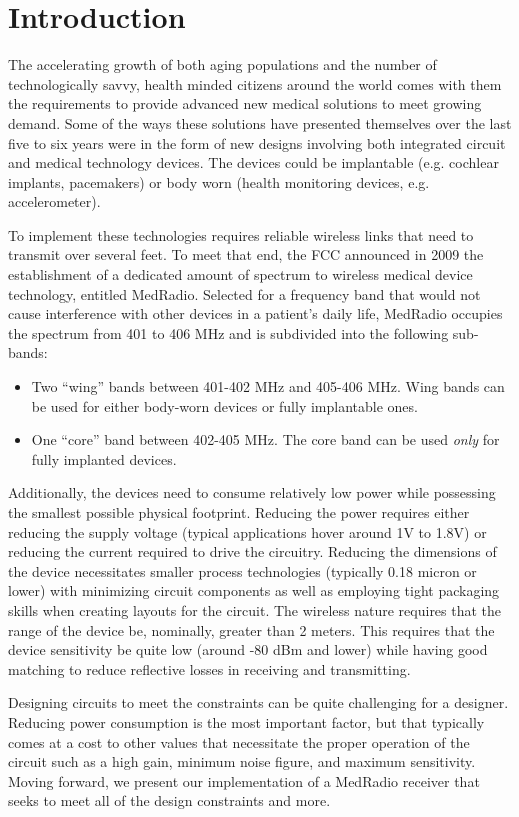 \section{Introduction}
The accelerating growth of both aging populations and the number of technologically savvy, health minded citizens around the world comes with them the requirements to provide advanced new medical solutions to meet growing demand. Some of the ways these solutions have presented themselves over the last five to six years were in the form of new designs involving both integrated circuit and medical technology devices. The devices could be implantable (e.g. cochlear implants, pacemakers) or body worn (health monitoring devices, e.g. accelerometer). 

To implement these technologies requires reliable wireless links that need to transmit over several feet. To meet that end, the FCC announced in 2009 the establishment of a dedicated amount of spectrum to wireless medical device technology, entitled MedRadio. Selected for a frequency band that would not cause interference with other devices in a patient's daily life, MedRadio occupies the spectrum from 401 to 406 MHz and is subdivided into the following sub-bands:
\begin{itemize}
	\item Two ``wing'' bands between 401-402 MHz and 405-406 MHz. Wing bands can be used for either body-worn devices or fully implantable ones.
	\item One ``core'' band between 402-405 MHz. The core band can be used \emph{only} for fully implanted devices.
\end{itemize}

Additionally, the devices need to consume relatively low power while possessing the smallest possible physical footprint. Reducing the power requires either reducing the supply voltage (typical applications hover around 1V to 1.8V) or reducing the current required to drive the circuitry. Reducing the dimensions of the device necessitates smaller process technologies (typically 0.18 micron or lower) with minimizing circuit components as well as employing tight packaging skills when creating layouts for the circuit. The wireless nature requires that the range of the device be, nominally, greater than 2 meters. This requires that the device sensitivity be quite low (around -80 dBm and lower) while having good matching to reduce reflective losses in receiving and transmitting.

Designing circuits to meet the constraints can be quite challenging for a designer. Reducing power consumption is the most important factor, but that typically comes at a cost to other values that necessitate the proper operation of the circuit such as a high gain, minimum noise figure, and maximum sensitivity. Moving forward, we present our implementation of a MedRadio receiver that seeks to meet all of the design constraints and more.
